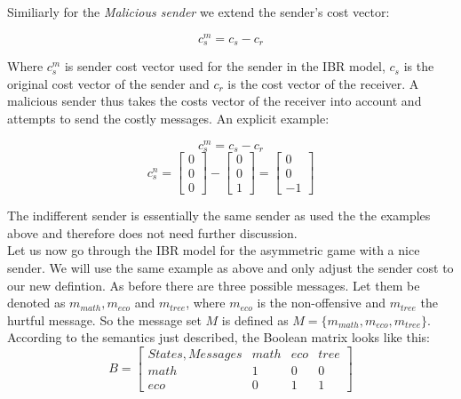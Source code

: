 \documentclass[10]{article}
\begin{document}
Similiarly for the \textit{Malicious sender} we extend the sender's cost vector:

\begin{equation*}
c_s^m= c_s - c_r
\end{equation*}

Where $c_s^m$ is sender cost vector used for the sender in the IBR model, $c_s$ is the original cost vector of the sender and $c_r$ is the cost vector of the receiver. A malicious sender thus takes the costs vector of the receiver into account and attempts to send the costly messages. An explicit example:

\begin{equation*}
c_s^m= c_s - c_r
\end{equation*}
\begin{equation*}
c_s^n=
\begin{bmatrix}
0 \\
0 \\
0
\end{bmatrix}
-
\begin{bmatrix}
0 \\
0 \\
1
\end{bmatrix}
=
\begin{bmatrix}
0 \\
0 \\
-1
\end{bmatrix}
\end{equation*}

The indifferent sender is essentially the same sender as used the the examples above and therefore does not need further discussion. \\

Let us now go through the IBR model for the asymmetric game with a nice sender. We will use the same example as above and only adjust the sender cost to our new defintion. As before there are three possible messages. Let them be denoted as $m_{math},m_{eco}$ and $m_{tree}$, where $m_{eco}$ is the non-offensive and $m_{tree}$ the hurtful message. So the message set $M$ is defined as $M=\{m_{math},m_{eco},m_{tree}\}$. According to the semantics just described, the Boolean matrix looks like this:\\
\begin{equation*}
B =
\begin{bmatrix}

States, Messages & math & eco & tree \\
math             & 1    & 0   & 0    \\
eco              & 0    & 1   & 1
\end{bmatrix}
\end{equation*}
\end{document}
